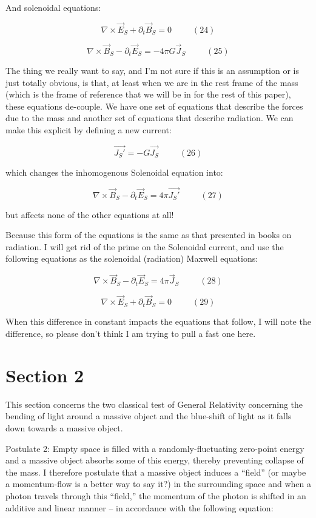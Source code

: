 \documentclass {article}
\begin{document}
And solenoidal equations:

$$\nabla \times \vec E_S + \partial_t \vec B_S = 0 ~~~~~~~~~~~ (24)$$

$$\nabla \times \vec B_S - \partial_t \vec E_S =  - 4 \pi G \vec J_S ~~~~~~~~~~~ (25)$$

The thing we really want to say, and I'm not sure if this is an assumption or is just totally obvious, is that, at least when we are in the rest frame of the mass (which is the frame of reference that we will be in for the rest of this paper), these equations de-couple. We have one set of equations that describe the forces due to the mass and another set of equations that describe radiation. We can make this explicit by defining a new current:

$$\vec {J_S'} = - G \vec {J_S} ~~~~~~~~~~~ (26)$$

which changes the inhomogenous Solenoidal equation into:

$$\nabla \times \vec B_S - \partial_t \vec E_S =  4 \pi \vec {J_S'} ~~~~~~~~~~~ (27)$$

but affects none of the other equations at all!

Because this form of the equations is the same as that presented in books on radiation. I will get rid of the prime on the Solenoidal current, and use the following equations as the solenoidal (radiation) Maxwell equations:

$$\nabla \times \vec B_S - \partial_t \vec E_S =  4 \pi \vec J_S ~~~~~~~~~~~ (28)$$

$$\nabla \times \vec E_S + \partial_t \vec B_S = 0 ~~~~~~~~~~~ (29)$$

When this difference in constant impacts the equations that follow, I will note the difference, so please don't think I am trying to pull a fast one here.

\section{Section 2}

This section concerns the two classical test of General Relativity concerning the bending of light around a massive object and the blue-shift of light as it falls down towards a massive object.

Postulate 2: Empty space is filled with a randomly-fluctuating zero-point energy and a massive object absorbs some of this energy, thereby preventing collapse of the mass. I therefore postulate that a massive object induces a “field” (or maybe a momentum-flow is a better way to say it?) in the surrounding space and when a photon travels through this “field,” the momentum of the photon is shifted in an additive and linear manner – in accordance with the following equation: 
\end{document}
